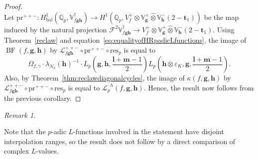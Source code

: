 \documentclass[a4paper,11pt]{amsart}
\theoremstyle{plain}
\theoremstyle{definition}
\theoremstyle{remark}
\newtheorem{remarkwr}[theorem]{Remark}
\newenvironment{remark}{\begin{remarkwr}\begin{upshape}}{\end{upshape}\end{remarkwr}}
\newcommand{\bb}{\mathbb}
\newcommand{\cl}{\mathcal}
\DeclareMathOperator{\BF}{BF}
\DeclareMathOperator{\bal}{bal}
\newcommand{\Lp}{{\mathscr{L}_p}}
\newcommand{\hg}{{\mathbf{g}}}
\newcommand{\hh}{{\mathbf h}}
\newcommand{\res}{\mathrm{res}}
\numberwithin{equation}{section}
\begin{document}
\begin{proof}
\[    \]
    Let $\mathrm{pr}^{++-}:H^1_{\bal}(\bb{Q}_p,\bb{V}_{f\hg\hh}^\dagger)\rightarrow H^1(\bb{Q}_p,V_f^+\otimes\bb{V}_\hg^+\hat{\otimes}\bb{V}_\hh^-(2-\mathbf{t}_1))$ be the map induced by the natural projection $\mathscr{F}^2\bb{V}_{f\hg\hh}^\dagger\rightarrow V_f^+\otimes\bb{V}_\hg^+\hat{\otimes}\bb{V}_\hh^-(2-\mathbf{t}_1)$. Using Theorem~\ref{reclaw} and equation~\ref{eq:equalityofHRpadicLfunctions}, the image of $\BF(f,\hg,\hh)$ by $\cl{L}_{f\hg\hh}^{++-}\circ \mathrm{pr}^{++-}\circ \res_p$ is equal to
    \[
    \Omega_{f,\gamma}\cdot\lambda_{N_h}(\hh)^{-1}\cdot L_p\left(\hg,\hh,\frac{\mathbf{l}+\mathbf{m}-1}{2}\right)L_p\left(\hh\otimes\varepsilon_K,\hg,\frac{\mathbf{l}+\mathbf{m}-1}{2}\right).
    \]
    Also, by Theorem~\ref{thm:reclawdiagonalcycles}, the image of $\kappa(f,\hg,\hh)$ by $\cl{L}_{f\hg\hh}^{++-}\circ \mathrm{pr}^{++-}\circ \res_p$ is equal to $\Lp^h(f,\hg,\hh)$. Hence, the result now follows from the previous corollary.
    
\end{proof}

\begin{remark}
    Note that the $p$-adic $L$-functions involved in the statement have disjoint interpolation ranges, so the result does not follow by a direct comparison of complex $L$-values.
\end{remark}
\end{document}
